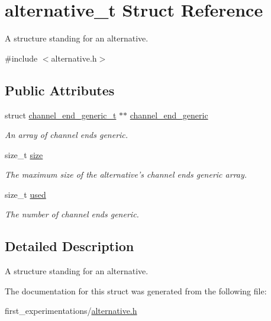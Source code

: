 \hypertarget{structalternative__t}{\section{alternative\-\_\-t Struct Reference}
\label{structalternative__t}
}


A structure standing for an alternative.  




{\ttfamily \#include $<$alternative.\-h$>$}

\subsection*{Public Attributes}
\begin{DoxyCompactItemize}
\item 
\hypertarget{structalternative__t_a38b43d51a3d5fd8bc344d51b2f837574}{struct \hyperlink{structchannel__end__generic__t}{channel\-\_\-end\-\_\-generic\-\_\-t} $\ast$$\ast$ \hyperlink{structalternative__t_a38b43d51a3d5fd8bc344d51b2f837574}{channel\-\_\-end\-\_\-generic}}\label{structalternative__t_a38b43d51a3d5fd8bc344d51b2f837574}

\begin{DoxyCompactList}\small\item\em An array of channel ends generic. \end{DoxyCompactList}\item 
\hypertarget{structalternative__t_aca939abbe3c58a9cff3444bbd8399462}{size\-\_\-t \hyperlink{structalternative__t_aca939abbe3c58a9cff3444bbd8399462}{size}}\label{structalternative__t_aca939abbe3c58a9cff3444bbd8399462}

\begin{DoxyCompactList}\small\item\em The maximum size of the alternative's channel ends generic array. \end{DoxyCompactList}\item 
\hypertarget{structalternative__t_ae7cdf9285b349c510db94f9f78a89630}{size\-\_\-t \hyperlink{structalternative__t_ae7cdf9285b349c510db94f9f78a89630}{used}}\label{structalternative__t_ae7cdf9285b349c510db94f9f78a89630}

\begin{DoxyCompactList}\small\item\em The number of channel ends generic. \end{DoxyCompactList}\end{DoxyCompactItemize}


\subsection{Detailed Description}
A structure standing for an alternative. 

The documentation for this struct was generated from the following file\-:\begin{DoxyCompactItemize}
\item 
first\-\_\-experimentations/\hyperlink{alternative_8h}{alternative.\-h}\end{DoxyCompactItemize}
